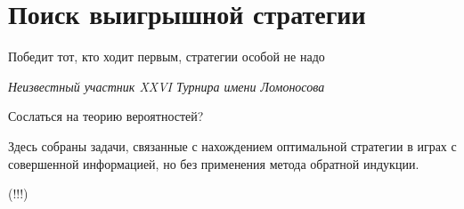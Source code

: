 

\section{Поиск выигрышной стратегии}
Победит тот, кто ходит первым, стратегии особой не надо

{\it Неизвестный участник  XXVI  Турнира имени Ломоносова}


{\red Сослаться на теорию вероятностей?}


Здесь собраны задачи, связанные с нахождением оптимальной стратегии в играх с совершенной информацией, но без применения метода обратной индукции.

{ (!!!)}









